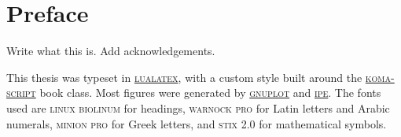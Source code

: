 \chapter*{Preface}\noindent
Write what this is. Add acknowledgements.

This thesis was typeset in \href{http://www.luatex.org/}{\textsc{lualatex}}, with a custom style built around the \href{https://ctan.org/pkg/koma-script?lang=en}{\textsc{koma-script}} book class.
Most figures were generated by \href{http://www.gnuplot.info/}{\textsc{gnuplot}} and \href{https://ipe.otfried.org/}{\textsc{ipe}}.
The fonts used are \textsc{linux biolinum} for headings, \textsc{warnock pro} for Latin letters and Arabic numerals, \textsc{minion pro} for Greek letters, and \textsc{stix} 2.0 for mathematical symbols.
